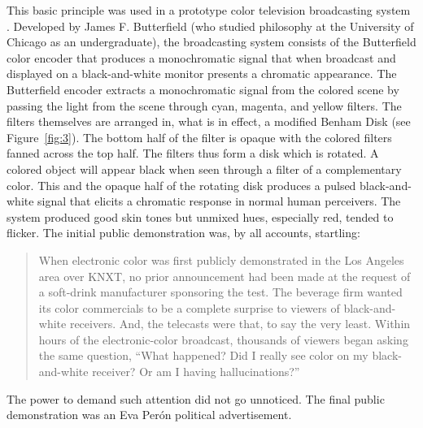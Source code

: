 This basic principle was used in a prototype color television broadcasting system \citep[]{Butterfield:1968uq,Butterfield:1970kx}. Developed by James F. Butterfield (who studied philosophy at the University of Chicago as an undergraduate), the broadcasting system consists of the Butterfield color encoder that produces a monochromatic signal that when broadcast and displayed on a black-and-white monitor presents a chromatic appearance. The Butterfield encoder extracts a monochromatic signal from the colored scene by passing the light from the scene through cyan, magenta, and yellow filters. The filters themselves are arranged in, what is in effect, a modified Benham Disk (see Figure~\ref{fig:3}). The bottom half of the filter is opaque with the colored filters fanned across the top half. The filters thus form a disk which is rotated. A colored object will appear black when seen through a filter of a complementary color. This and the opaque half of the rotating disk produces a pulsed black-and-white signal that elicits a chromatic response in normal human perceivers. The system produced good skin tones but unmixed hues, especially red, tended to flicker. The initial public demonstration was, by all accounts, startling:
\begin{quote}
    When electronic color was first publicly demonstrated in the Los Angeles area over KNXT, no prior announcement had been made at the request of a soft-drink manufacturer sponsoring the test. The beverage firm wanted its color commercials to be a complete surprise to viewers of black-and-white receivers. And, the telecasts were that, to say the very least. Within hours of the electronic-color broadcast, thousands of viewers began asking the same question, ``What happened? Did I really see color on my black-and-white receiver? Or am I having hallucinations?'' \citep[]{Griffin:1968fk}
\end{quote}
The power to demand such attention did not go unnoticed. The final public demonstration was an Eva Perón political advertisement.


